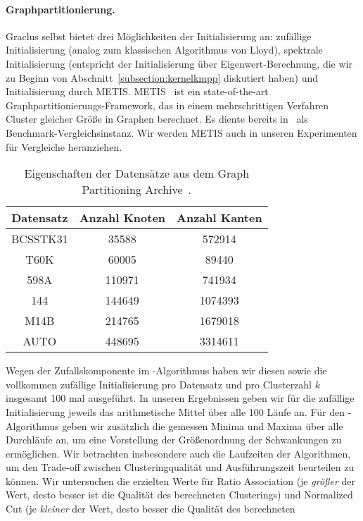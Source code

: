 \paragraph{Graphpartitionierung.} Graclus selbst bietet drei Möglichkeiten der Initialisierung an: zufällige Initialisierung (analog zum klassischen Algorithmus
von Lloyd), spektrale Initialisierung (entspricht der Initialisierung über Eigenwert-Berechnung, die wir zu Beginn von
Abschnitt~\ref{subsection:kernelkmpp} diskutiert haben) und Initialisierung durch METIS. METIS~\cite{KarypisK98} ist ein
state-of-the-art Graphpartitionierungs-Framework, das in einem mehrschrittigen Verfahren Cluster gleicher Größe in Graphen
berechnet. Es diente bereits in~\cite{DhillonGK04,DhillonGK07} als Benchmark-Vergleichsinstanz. Wir werden METIS auch in
unseren Experimenten für Vergleiche heranziehen.
\begin{table}[t]
\centering
\begin{tabular}{@{}ccc@{}} \toprule
	\textbf{Datensatz} & \textbf{Anzahl Knoten} & \textbf{Anzahl Kanten} \\ \midrule
	BCSSTK31 & 35588 & 572914 \\
	T60K & 60005 & 89440 \\
	598A & 110971 & 741934 \\
	144 & 144649 & 1074393 \\
	M14B & 214765 & 1679018 \\
	AUTO & 448695 & 3314611 \\
	\bottomrule
\end{tabular}
\caption{Eigenschaften der Datensätze aus dem Graph Partitioning Archive~\cite{SoperWC04}.}
\label{tbl:experiment-kkmpp-datasets}
\end{table}
\absatz
Wegen der Zufallskomponente im \kkmpp-Algorithmus haben wir diesen sowie die vollkommen zufällige Initialisierung pro
Datensatz und pro Clusterzahl $k$ insgesamt 100 mal ausgeführt. In unseren Ergebnissen geben wir für die zufällige Initialisierung
jeweils das arithmetische Mittel über alle 100 Läufe an. Für den \kkmpp-Algorithmus geben wir zusätzlich die gemessen Minima
und Maxima über alle Durchläufe an, um eine Vorstellung der Größenordnung der Schwankungen zu ermöglichen. Wir betrachten
insbesondere auch die Laufzeiten der Algorithmen, um den Trade-off zwischen Clusteringqualität und Ausführungszeit beurteilen
zu können. Wir untersuchen die erzielten Werte für Ratio Association (je \emph{größer} der Wert, desto besser ist die Qualität
des berechneten Clusterings) und Normalized Cut (je \emph{kleiner} der Wert, desto besser die Qualität des berechneten
